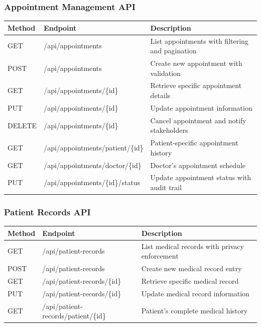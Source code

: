 \documentclass[12pt,a4paper]{article}
\begin{document}
\subsubsection{Appointment Management API}

\begin{longtable}{|p{1.5cm}|p{4cm}|p{6.5cm}|}
\hline
\textbf{Method} & \textbf{Endpoint} & \textbf{Description} \\
\hline
GET & /api/appointments & List appointments with filtering and pagination \\
\hline
POST & /api/appointments & Create new appointment with validation \\
\hline
GET & /api/appointments/\{id\} & Retrieve specific appointment details \\
\hline
PUT & /api/appointments/\{id\} & Update appointment information \\
\hline
DELETE & /api/appointments/\{id\} & Cancel appointment and notify stakeholders \\
\hline
GET & /api/appointments/patient/\{id\} & Patient-specific appointment history \\
\hline
GET & /api/appointments/doctor/\{id\} & Doctor's appointment schedule \\
\hline
PUT & /api/appointments/\{id\}/status & Update appointment status with audit trail \\
\hline
\end{longtable}

\subsubsection{Patient Records API}

\begin{longtable}{|p{1.5cm}|p{4cm}|p{6.5cm}|}
\hline
\textbf{Method} & \textbf{Endpoint} & \textbf{Description} \\
\hline
GET & /api/patient-records & List medical records with privacy enforcement \\
\hline
POST & /api/patient-records & Create new medical record entry \\
\hline
GET & /api/patient-records/\{id\} & Retrieve specific medical record \\
\hline
PUT & /api/patient-records/\{id\} & Update medical record information \\
\hline
GET & /api/patient-records/patient/\{id\} & Patient's complete medical history \\
\hline
\end{longtable}
\end{document}
